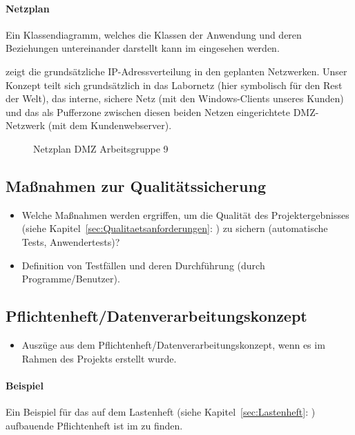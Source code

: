 \paragraph{Netzplan}
Ein Klassendiagramm, welches die Klassen der Anwendung und deren Beziehungen untereinander darstellt kann im  eingesehen werden.

 zeigt die grundsätzliche IP-Adressverteilung in den geplanten Netzwerken. 
Unser Konzept teilt sich grundsätzlich in das Labornetz (hier symbolisch für den Rest der Welt), das interne, sichere Netz (mit den Windows-Clients unseres Kunden) und das als Pufferzone zwischen diesen beiden Netzen eingerichtete \ac{DMZ}-Netzwerk (mit dem Kundenwebserver).
\begin{figure}[htb]
\centering
{}
\caption{Netzplan DMZ Arbeitsgruppe 9}
\label{fig:Netzplan}
\end{figure}


\subsection{Maßnahmen zur Qualitätssicherung}
\label{sec:Qualitaetssicherung}
\begin{itemize}
	\item Welche Maßnahmen werden ergriffen, um die Qualität des Projektergebnisses (siehe Kapitel~\ref{sec:Qualitaetsanforderungen}: ) zu sichern (\zB automatische Tests, Anwendertests)?
	\item \Ggfs Definition von Testfällen und deren Durchführung (durch Programme/Benutzer).
\end{itemize}


\subsection{Pflichtenheft/Datenverarbeitungskonzept}
\label{sec:Pflichtenheft}
\begin{itemize}
	\item Auszüge aus dem Pflichtenheft/Datenverarbeitungskonzept, wenn es im Rahmen des Projekts erstellt wurde.
\end{itemize}

\paragraph{Beispiel}
Ein Beispiel für das auf dem Lastenheft (siehe Kapitel~\ref{sec:Lastenheft}: ) aufbauende Pflichtenheft ist im  zu finden.


